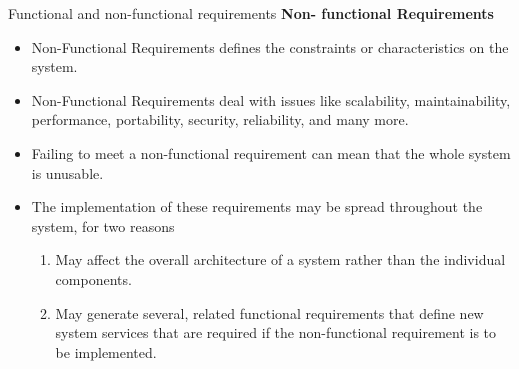 \documentclass{beamer}
\begin{document}
\begin{frame}{Functional and non-functional requirements}
	\textbf{Non- functional Requirements}
	\begin{itemize}
		\item Non-Functional Requirements defines the constraints or characteristics on the system.
		\item Non-Functional Requirements deal with issues like scalability, maintainability, performance, portability, security, reliability, and many more.
		\item Failing to meet a non-functional requirement can mean that the whole system is 
		unusable.
	
		\item The implementation of these requirements may be spread throughout the system, for two reasons
		\begin{enumerate}
			\item May affect the overall architecture of a system rather than the individual components.
			\item May generate several, related functional requirements that define new system services 
			that are required if the non-functional requirement is to be implemented.
		\end{enumerate}
	\end{itemize}
\end{frame}
\end{document}
